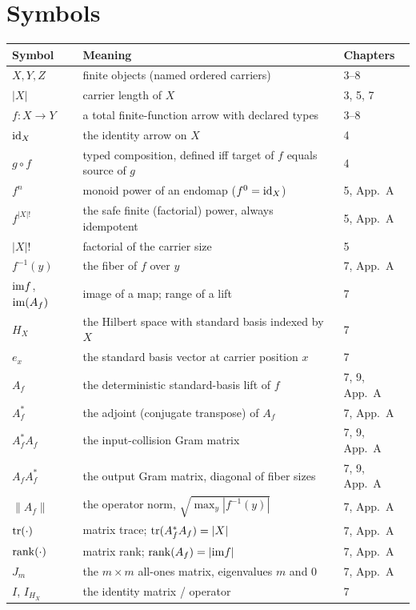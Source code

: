 \section{Symbols}\label{appC:sec:symbols}

\begin{longtable}{@{}lp{9.2cm}l@{}}
\toprule
Symbol & Meaning & Chapters \\
\midrule
\endhead
$X, Y, Z$ & finite objects (named ordered carriers) & 3--8 \\
$|X|$ & carrier length of $X$ & 3, 5, 7 \\
$f : X \to Y$ & a total finite-function arrow with declared types & 3--8 \\
$\mathrm{id}_X$ & the identity arrow on $X$ & 4 \\
$g \circ f$ & typed composition, defined iff target of $f$ equals source of $g$ & 4 \\
$f^{n}$ & monoid power of an endomap ($f^{0} = \mathrm{id}_X$) & 5, App.~A \\
$f^{|X|!}$ & the safe finite (factorial) power, always idempotent & 5, App.~A \\
$|X|!$ & factorial of the carrier size & 5 \\
$f^{-1}(y)$ & the fiber of $f$ over $y$ & 7, App.~A \\
$\mathrm{im} f$, $\mathrm{im}(A_f)$ & image of a map; range of a lift & 7 \\
$H_X$ & the Hilbert space with standard basis indexed by $X$ & 7 \\
$e_x$ & the standard basis vector at carrier position $x$ & 7 \\
$A_f$ & the deterministic standard-basis lift of $f$ & 7, 9, App.~A \\
$A_f^{*}$ & the adjoint (conjugate transpose) of $A_f$ & 7, App.~A \\
$A_f^{*} A_f$ & the input-collision Gram matrix & 7, 9, App.~A \\
$A_f A_f^{*}$ & the output Gram matrix, diagonal of fiber sizes & 7, 9, App.~A \\
$\lVert A_f \rVert$ & the operator norm, $\sqrt{\max_y |f^{-1}(y)|}$ & 7, App.~A \\
$\mathrm{tr}(\cdot)$ & matrix trace; $\mathrm{tr}(A_f^{*}A_f) = |X|$ & 7, App.~A \\
$\mathrm{rank}(\cdot)$ & matrix rank; $\mathrm{rank}(A_f) = |\mathrm{im} f|$ & 7, App.~A \\
$J_m$ & the $m \times m$ all-ones matrix, eigenvalues $m$ and $0$ & 7, App.~A \\
$I$, $I_{H_X}$ & the identity matrix / operator & 7 \\

\end{longtable}
